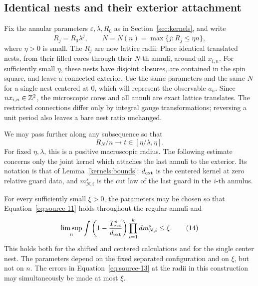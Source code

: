 \subsection{Identical nests and their exterior attachment}

Fix the annular parameters \(\varepsilon,\lambda,R_0\) as in
Section~\ref{sec:kernels}, and write
\[
 R_j=R_0\lambda^j,\qquad
 N=N(n)=\max\{j:R_j\leq\eta n\},
\]
where \(\eta>0\) is small.  The \(R_j\) are now lattice radii.
Place identical translated nests, from their filled cores through
their \(N\)-th annuli, around all \(x_{i,n}\).
For sufficiently small \(\eta\), these nests have disjoint closures,
are contained in the spin square, and leave a connected exterior.
Use the same parameters and the same \(N\) for a single nest centered
at \(0\), which will represent the observable \(a_n\).
Since \(nx_{i,n}\in\mathbb Z^2\), the microscopic cores and all annuli are
exact lattice translates.  The restricted connections differ only
by integral gauge transformations; reversing a unit period also
leaves a bare nest ratio unchanged.

We may pass further along any subsequence so that
\[
 R_N/n\longrightarrow t\in[\eta/\lambda,\eta].
\]
For fixed \(\eta,\lambda\), this is a positive macroscopic radius.
The following estimate concerns only the joint kernel which attaches
the last annuli to the exterior.  Its notation is that of
Lemma~\ref{kernels:bounds}: \(d_{\rm ext}\) is the centered kernel
at zero relative guard data, and \(m_{N,i}^s\) is the cut law of
the last guard in the \(i\)-th annulus.

\begin{lemma}\label{correlations:attachment}
For every sufficiently small \(\xi>0\), the parameters may be chosen
so that Equation~\eqref{eq:source-11} holds throughout the regular
annuli and
\begin{equation}
 \limsup_n\int
       \left(1-\frac{T_{\rm ext}^s}{d_{\rm ext}}\right)
                 \prod_{i=1}^k dm_{N,i}^s
 \leq\xi .
 \tag{14}\label{eq:source-14}
\end{equation}
This holds both for the shifted and centered calculations and for
the single center nest.  The parameters depend on the fixed
separated configuration and on \(\xi\), but not on \(n\).
The errors in Equation~\eqref{eq:source-13} at the radii in this
construction may simultaneously be made at most \(\xi\).
\end{lemma}

